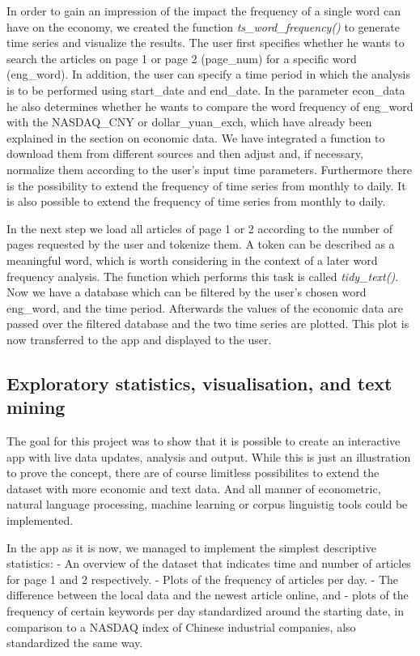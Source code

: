 \documentclass[12pt,a4paper]{article}
\begin{document}
In order to gain an impression of the impact the frequency of a single
word can have on the economy, we created the function
\emph{ts\_word\_frequency()} to generate time series and visualize the
results. The user first specifies whether he wants to search the
articles on page 1 or page 2 (page\_num) for a specific word
(eng\_word). In addition, the user can specify a time period in which
the analysis is to be performed using start\_date and end\_date. In the
parameter econ\_data he also determines whether he wants to compare the
word frequency of eng\_word with the NASDAQ\_CNY or dollar\_yuan\_exch,
which have already been explained in the section on economic data. We
have integrated a function to download them from different sources and
then adjust and, if necessary, normalize them according to the user's
input time parameters. Furthermore there is the possibility to extend
the frequency of time series from monthly to daily. It is also possible
to extend the frequency of time series from monthly to daily.

In the next step we load all articles of page 1 or 2 according to the
number of pages requested by the user and tokenize them. A token can be
described as a meaningful word, which is worth considering in the
context of a later word frequency analysis. The function which performs
this task is called \emph{tidy\_text()}. Now we have a database which
can be filtered by the user's chosen word eng\_word, and the time
period. Afterwards the values of the economic data are passed over the
filtered database and the two time series are plotted. This plot is now
transferred to the app and displayed to the user.

\hypertarget{exploratory-statistics-visualisation-and-text-mining}{%
\subsection{Exploratory statistics, visualisation, and text
mining}\label{exploratory-statistics-visualisation-and-text-mining}}

The goal for this project was to show that it is possible to create an
interactive app with live data updates, analysis and output. While this
is just an illustration to prove the concept, there are of course
limitless possibilites to extend the dataset with more economic and text
data. And all manner of econometric, natural language processing,
machine learning or corpus linguistig tools could be implemented.

In the app as it is now, we managed to implement the simplest
descriptive statistics: - An overview of the dataset that indicates time
and number of articles for page 1 and 2 respectively. - Plots of the
frequency of articles per day. - The difference between the local data
and the newest article online, and - plots of the frequency of certain
keywords per day standardized around the starting date, in comparison to
a NASDAQ index of Chinese industrial companies, also standardized the
same way.
\end{document}
